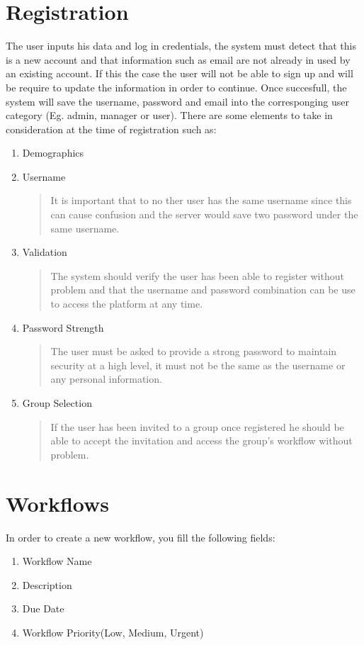 \documentclass{article}[draft]
\begin{document}
\section{Registration}
The user inputs his data and log in credentials, the system must detect that this is a new account and that information such as email are not already in used by an existing account. If this the case the user will not be able to sign up and will be require to update the information in order to continue. Once succesfull, the system will save the username, password and email into the corresponging user category (Eg. admin, manager or user). There are some elements to take in consideration at the time of registration such as:
\begin{enumerate}
  \item Demographics

  \item Username
  \begin{quote}
    It is important that to no ther user has the same username since this can cause confusion and the server would save two password under the same username.
  \end{quote}

  \item Validation
  \begin{quote}
    The system should verify the user has been able to register without problem and that the username and password combination can be use to access the platform at any time.
  \end{quote}

  \item Password Strength
  \begin{quote}
    The user must be asked to provide a strong password to maintain security at a high level, it must not be the same as the username or any personal information.
  \end{quote}

  \item Group Selection
  \begin{quote}
    If the user has been invited to a group once registered he should be able to accept the invitation and access the group's workflow without problem.
  \end{quote}
\end{enumerate}
\section{Workflows}
In order to create a new workflow, you fill the following fields:
\begin{enumerate}
    \item Workflow Name
    \item Description
    \item Due Date
    \item Workflow Priority(Low, Medium, Urgent)
\end{enumerate}
\end{document}
